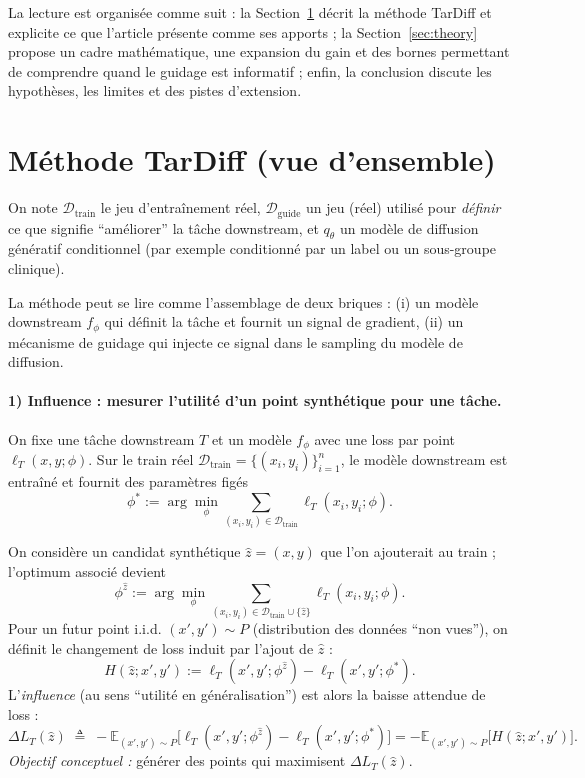 \documentclass[11pt]{article}
\begin{document}
La lecture est organisée comme suit : la Section~\ref{sec:method} décrit la méthode TarDiff et explicite ce que l'article présente comme ses apports ; la Section~\ref{sec:theory} propose un cadre mathématique, une expansion du gain et des bornes permettant de comprendre quand le guidage est informatif ; enfin, la conclusion discute les hypothèses, les limites et des pistes d'extension.

\section{Méthode TarDiff (vue d'ensemble)}
\label{sec:method}
On note $\mathcal D_{\text{train}}$ le jeu d'entraînement réel, $\mathcal D_{\text{guide}}$ un jeu (réel) utilisé pour \emph{définir} ce que signifie ``améliorer'' la tâche downstream, et $q_\theta$ un modèle de diffusion génératif conditionnel (par exemple conditionné par un label ou un sous-groupe clinique).

La méthode peut se lire comme l'assemblage de deux briques : (i) un modèle downstream $f_\phi$ qui définit la tâche et fournit un signal de gradient, (ii) un mécanisme de guidage qui injecte ce signal dans le sampling du modèle de diffusion.

\paragraph{1) Influence : mesurer l'utilité d'un point synthétique pour une tâche.}
On fixe une tâche downstream $T$ et un modèle $f_\phi$ avec une loss par point $\ell_T(x,y;\phi)$.
Sur le train réel
$\mathcal D_{\text{train}}=\{(x_i,y_i)\}_{i=1}^n$,
le modèle downstream est entraîné et fournit des paramètres figés
\[
\phi^*:=\arg\min_{\phi}\sum_{(x_i,y_i)\in\mathcal D_{\text{train}}}\ell_T(x_i,y_i;\phi).
\]

On considère un candidat synthétique $\hat z=(x,y)$ que l'on ajouterait au train ; l'optimum associé devient
\[
\phi^{\hat z}:=\arg\min_{\phi}\sum_{(x_i,y_i)\in\mathcal D_{\text{train}}\cup\{\hat z\}}\ell_T(x_i,y_i;\phi).
\]
Pour un futur point i.i.d. $(x',y')\sim P$ (distribution des données ``non vues''), on définit le changement de loss induit par l'ajout de $\hat z$ :
\[
H(\hat z; x',y'):=\ell_T(x',y';\phi^{\hat z})-\ell_T(x',y';\phi^*).
\]
L'\emph{influence} (au sens ``utilité en généralisation'') est alors la baisse attendue de loss :
\[
\Delta L_T(\hat z)
\;\triangleq\;
-\mathbb E_{(x',y')\sim P}\big[\ell_T(x',y';\phi^{\hat z})-\ell_T(x',y';\phi^*)\big]
= -\mathbb E_{(x',y')\sim P}\big[H(\hat z; x',y')\big].
\]
\emph{Objectif conceptuel :} générer des points qui maximisent $\Delta L_T(\hat z)$.
\end{document}
